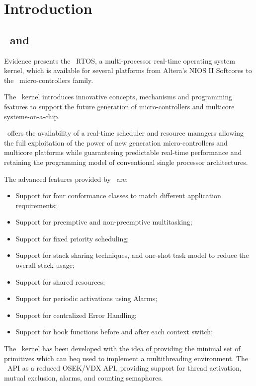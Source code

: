 \chapter{Introduction}

\section{\ee\ and \rtd}

Evidence presents the \ee\ RTOS, a multi-processor real-time operating 
system kernel, which is available for several platforms from Altera's 
NIOS II Softcores to the \dspic\ micro-controllers family. 

The \ee\ kernel introduces innovative concepts, mechanisms and programming
features to support the future generation of micro-controllers and multicore
systems-on-a-chip.

\ee\ offers the availability of a real-time scheduler and resource 
managers allowing the full exploitation of the power of new generation 
micro-controllers and multicore platforms while guaranteeing predictable 
real-time performance and retaining the programming model of 
conventional single processor architectures.

The advanced features provided by \ee\ are:

\begin{itemize}
\item Support for four conformance classes to match different
application requirements;
\item Support for preemptive and non-preemptive multitasking;
\item Support for fixed priority scheduling;
\item Support for stack sharing techniques, and one-shot task
model to reduce the overall stack usage;
\item Support for shared resources;
\item Support for periodic activations using Alarms;
\item Support for centralized Error Handling;
\item Support for hook functions before and after each context
switch;
\end{itemize}

The \ee\ kernel has been developed with the idea of providing the
minimal set of primitives which can beq used to implement a
multithreading environment. The \ee\ API as a reduced OSEK/VDX API,
providing support for thread activation, mutual exclusion, alarms, and 
counting semaphores.


